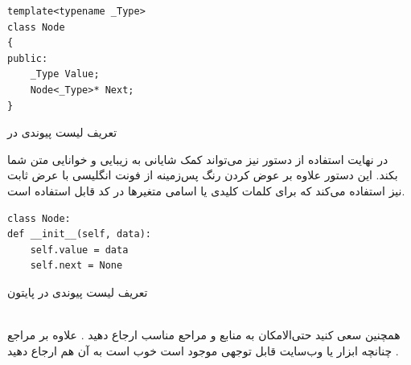 \begin{program}[H]
\begin{verbatim}
template<typename _Type>
class Node
{
public:
    _Type Value;
    Node<_Type>* Next;
}
\end{verbatim}
\label{cppnode}
\caption{تعریف لیست پیوندی در ‌}
\end{program}
در نهایت استفاده از دستور 
نیز می‌تواند کمک شایانی به زیبایی و خوانایی متن شما بکند. این دستور علاوه بر عوض کردن رنگ پس‌زمینه از فونت انگلیسی با عرض ثابت نیز استفاده می‌کند که برای کلمات کلیدی یا اسامی متغیرها در کد قابل استفاده است.

\begin{program}[H]
\begin{verbatim}
class Node: 
def __init__(self, data): 
    self.value = data
    self.next = None  
\end{verbatim}
\label{pythonnode}
\caption{تعریف لیست پیوندی در ‌پایتون}
\end{program}

\\
همچنین سعی کنید حتی‌الامکان به منابع و مراحع مناسب ارجاع دهید
\cite{CLRS}. 
علاوه بر مراجع چنانچه ابزار یا وب‌سایت قابل توجهی موجود است خوب است به آن هم ارجاع دهید
\cite{visualizationwebsite}. 

